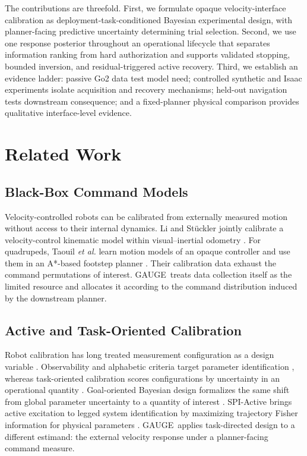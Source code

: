 \documentclass[letterpaper,10pt,conference]{ieeeconf}
\newcommand{\method}{GAUGE}
\begin{document}
The contributions are threefold. First, we formulate opaque velocity-interface
calibration as deployment-task-conditioned Bayesian experimental design, with
planner-facing predictive uncertainty determining trial selection. Second, we
use one response posterior throughout an operational lifecycle that separates
information ranking from hard authorization and supports validated stopping,
bounded inversion, and residual-triggered active recovery. Third, we establish
an evidence ladder: passive Go2 data test model need; controlled synthetic and
Isaac experiments isolate acquisition and recovery mechanisms; held-out
navigation tests downstream consequence; and a fixed-planner physical
comparison provides qualitative interface-level evidence.

\section{Related Work}

\subsection{Black-Box Command Models}

Velocity-controlled robots can be calibrated from externally measured motion
without access to their internal dynamics. Li and St\"uckler jointly calibrate a
velocity-control kinematic model within visual--inertial odometry
\cite{li2022vio}. For quadrupeds, Taouil \emph{et al.} learn motion models of an
opaque controller and use them in an A*-based footstep planner
\cite{taouil2023blackbox}. Their calibration data exhaust the command
permutations of interest. \method\ treats data collection itself as the limited
resource and allocates it according to the command distribution induced by the
downstream planner.

\subsection{Active and Task-Oriented Calibration}

Robot calibration has long treated measurement configuration as a design
variable \cite{hollerbach1996calibration,calafiore2001dynamic}.
Observability and alphabetic criteria target parameter identification
\cite{sun2008observability,sun2008active}, whereas task-oriented calibration
scores configurations by uncertainty in an operational quantity
\cite{carrillo2013task}. Goal-oriented Bayesian design formalizes the same shift
from global parameter uncertainty to a quantity of interest
\cite{attia2018goal}. SPI-Active brings active excitation to legged system
identification by maximizing trajectory Fisher information for physical
parameters \cite{sobanbabu2025spiactive}. \method\ applies task-directed design
to a different estimand: the external velocity response under a
planner-facing command measure.
\end{document}
